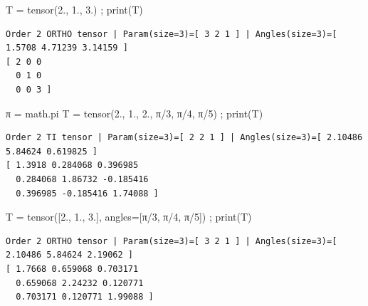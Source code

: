 \documentclass[
  letterpaper,
  DIV=11,
  numbers=noendperiod]{scrreprt}
\newenvironment{Shaded}{\begin{snugshade}}{\end{snugshade}}
\newcommand{\BuiltInTok}[1]{\textcolor[rgb]{0.00,0.23,0.31}{#1}}
\newcommand{\DecValTok}[1]{\textcolor[rgb]{0.68,0.00,0.00}{#1}}
\newcommand{\FloatTok}[1]{\textcolor[rgb]{0.68,0.00,0.00}{#1}}
\newcommand{\NormalTok}[1]{\textcolor[rgb]{0.00,0.23,0.31}{#1}}
\newcommand{\OperatorTok}[1]{\textcolor[rgb]{0.37,0.37,0.37}{#1}}
\begin{document}
\begin{Shaded}
\begin{Highlighting}[]
\NormalTok{T }\OperatorTok{=}\NormalTok{ tensor(}\FloatTok{2.}\NormalTok{, }\FloatTok{1.}\NormalTok{, }\FloatTok{3.}\NormalTok{) }\OperatorTok{;} \BuiltInTok{print}\NormalTok{(T)}
\end{Highlighting}
\end{Shaded}

\begin{verbatim}
Order 2 ORTHO tensor | Param(size=3)=[ 3 2 1 ] | Angles(size=3)=[ 1.5708 4.71239 3.14159 ]
[ 2 0 0 
  0 1 0 
  0 0 3 ]
\end{verbatim}

\begin{Shaded}
\begin{Highlighting}[]
\NormalTok{π }\OperatorTok{=}\NormalTok{ math.pi}
\NormalTok{T }\OperatorTok{=}\NormalTok{ tensor(}\FloatTok{2.}\NormalTok{, }\FloatTok{1.}\NormalTok{, }\FloatTok{2.}\NormalTok{, π}\OperatorTok{/}\DecValTok{3}\NormalTok{, π}\OperatorTok{/}\DecValTok{4}\NormalTok{, π}\OperatorTok{/}\DecValTok{5}\NormalTok{) }\OperatorTok{;} \BuiltInTok{print}\NormalTok{(T)}
\end{Highlighting}
\end{Shaded}

\begin{verbatim}
Order 2 TI tensor | Param(size=3)=[ 2 2 1 ] | Angles(size=3)=[ 2.10486 5.84624 0.619825 ]
[ 1.3918 0.284068 0.396985 
  0.284068 1.86732 -0.185416 
  0.396985 -0.185416 1.74088 ]
\end{verbatim}

\begin{Shaded}
\begin{Highlighting}[]
\NormalTok{T }\OperatorTok{=}\NormalTok{ tensor([}\FloatTok{2.}\NormalTok{, }\FloatTok{1.}\NormalTok{, }\FloatTok{3.}\NormalTok{], angles}\OperatorTok{=}\NormalTok{[π}\OperatorTok{/}\DecValTok{3}\NormalTok{, π}\OperatorTok{/}\DecValTok{4}\NormalTok{, π}\OperatorTok{/}\DecValTok{5}\NormalTok{]) }\OperatorTok{;} \BuiltInTok{print}\NormalTok{(T)}
\end{Highlighting}
\end{Shaded}

\begin{verbatim}
Order 2 ORTHO tensor | Param(size=3)=[ 3 2 1 ] | Angles(size=3)=[ 2.10486 5.84624 2.19062 ]
[ 1.7668 0.659068 0.703171 
  0.659068 2.24232 0.120771 
  0.703171 0.120771 1.99088 ]
\end{verbatim}
\end{document}
